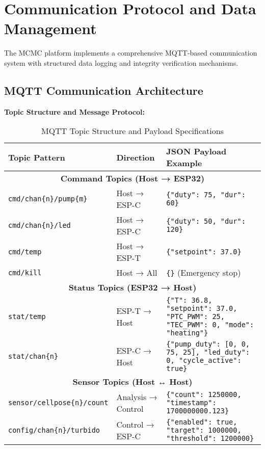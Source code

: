 \section{Communication Protocol and Data Management}

The MCMC platform implements a comprehensive MQTT-based communication system with structured data logging and integrity verification mechanisms.

\subsection{MQTT Communication Architecture}

\textbf{Topic Structure and Message Protocol:}

\begin{table}[H]
\centering
\caption{MQTT Topic Structure and Payload Specifications}
\begin{tabularx}{\textwidth}{|l|l|X|}
\hline
\textbf{Topic Pattern} & \textbf{Direction} & \textbf{JSON Payload Example} \\
\hline
\multicolumn{3}{|c|}{\textbf{Command Topics (Host → ESP32)}} \\
\hline
\texttt{cmd/chan\{n\}/pump\{m\}} & Host → ESP-C & \texttt{\{"duty": 75, "dur": 60\}} \\
\hline
\texttt{cmd/chan\{n\}/led} & Host → ESP-C & \texttt{\{"duty": 50, "dur": 120\}} \\
\hline
\texttt{cmd/temp} & Host → ESP-T & \texttt{\{"setpoint": 37.0\}} \\
\hline
\texttt{cmd/kill} & Host → All & \texttt{\{\}} (Emergency stop) \\
\hline
\multicolumn{3}{|c|}{\textbf{Status Topics (ESP32 → Host)}} \\
\hline
\texttt{stat/temp} & ESP-T → Host & \texttt{\{"T": 36.8, "setpoint": 37.0, "PTC\_PWM": 25, "TEC\_PWM": 0, "mode": "heating"\}} \\
\hline
\texttt{stat/chan\{n\}} & ESP-C → Host & \texttt{\{"pump\_duty": [0, 0, 75, 25], "led\_duty": 0, "cycle\_active": true\}} \\
\hline
\multicolumn{3}{|c|}{\textbf{Sensor Topics (Host ↔ Host)}} \\
\hline
\texttt{sensor/cellpose\{n\}/count} & Analysis → Control & \texttt{\{"count": 1250000, "timestamp": 1700000000.123\}} \\
\hline
\texttt{config/chan\{n\}/turbido} & Control → ESP-C & \texttt{\{"enabled": true, "target": 1000000, "threshold": 1200000\}} \\
\hline
\end{tabularx}
\end{table}

